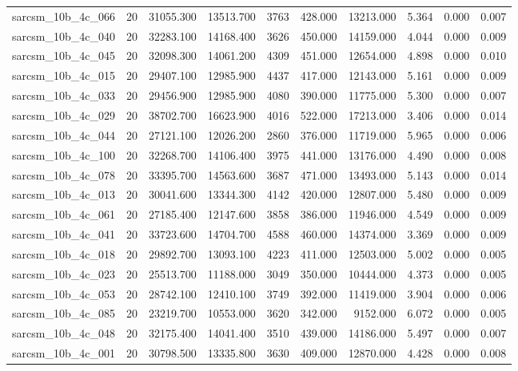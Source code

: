 \begin{tabular}{lrrrrrrrrr}
sarcsm\_10b\_4c\_066 & 20 & 31055.300 & 13513.700 & 3763 & 428.000 & 13213.000 & 5.364 & 0.000 & 0.007 \\
sarcsm\_10b\_4c\_040 & 20 & 32283.100 & 14168.400 & 3626 & 450.000 & 14159.000 & 4.044 & 0.000 & 0.009 \\
sarcsm\_10b\_4c\_045 & 20 & 32098.300 & 14061.200 & 4309 & 451.000 & 12654.000 & 4.898 & 0.000 & 0.010 \\
sarcsm\_10b\_4c\_015 & 20 & 29407.100 & 12985.900 & 4437 & 417.000 & 12143.000 & 5.161 & 0.000 & 0.009 \\
sarcsm\_10b\_4c\_033 & 20 & 29456.900 & 12985.900 & 4080 & 390.000 & 11775.000 & 5.300 & 0.000 & 0.007 \\
sarcsm\_10b\_4c\_029 & 20 & 38702.700 & 16623.900 & 4016 & 522.000 & 17213.000 & 3.406 & 0.000 & 0.014 \\
sarcsm\_10b\_4c\_044 & 20 & 27121.100 & 12026.200 & 2860 & 376.000 & 11719.000 & 5.965 & 0.000 & 0.006 \\
sarcsm\_10b\_4c\_100 & 20 & 32268.700 & 14106.400 & 3975 & 441.000 & 13176.000 & 4.490 & 0.000 & 0.008 \\
sarcsm\_10b\_4c\_078 & 20 & 33395.700 & 14563.600 & 3687 & 471.000 & 13493.000 & 5.143 & 0.000 & 0.014 \\
sarcsm\_10b\_4c\_013 & 20 & 30041.600 & 13344.300 & 4142 & 420.000 & 12807.000 & 5.480 & 0.000 & 0.009 \\
sarcsm\_10b\_4c\_061 & 20 & 27185.400 & 12147.600 & 3858 & 386.000 & 11946.000 & 4.549 & 0.000 & 0.009 \\
sarcsm\_10b\_4c\_041 & 20 & 33723.600 & 14704.700 & 4588 & 460.000 & 14374.000 & 3.369 & 0.000 & 0.009 \\
sarcsm\_10b\_4c\_018 & 20 & 29892.700 & 13093.100 & 4223 & 411.000 & 12503.000 & 5.002 & 0.000 & 0.005 \\
sarcsm\_10b\_4c\_023 & 20 & 25513.700 & 11188.000 & 3049 & 350.000 & 10444.000 & 4.373 & 0.000 & 0.005 \\
sarcsm\_10b\_4c\_053 & 20 & 28742.100 & 12410.100 & 3749 & 392.000 & 11419.000 & 3.904 & 0.000 & 0.006 \\
sarcsm\_10b\_4c\_085 & 20 & 23219.700 & 10553.000 & 3620 & 342.000 & 9152.000 & 6.072 & 0.000 & 0.005 \\
sarcsm\_10b\_4c\_048 & 20 & 32175.400 & 14041.400 & 3510 & 439.000 & 14186.000 & 5.497 & 0.000 & 0.007 \\
sarcsm\_10b\_4c\_001 & 20 & 30798.500 & 13335.800 & 3630 & 409.000 & 12870.000 & 4.428 & 0.000 & 0.008 \\

\end{tabular}
